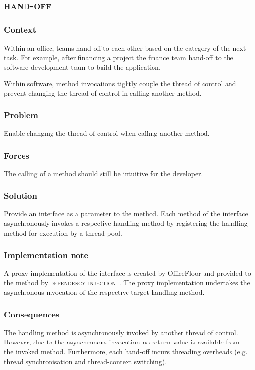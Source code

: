 \documentclass[prodmode]{style/acmlarge}
\begin{document}
\subsection{\textsc{\textbf{hand-off}}}

\subsubsection*{Context} Within an office, teams hand-off to each other based on
the category of the next task.  For example, after financing a project the
finance team hand-off to the software development team to build the application.

Within software, method invocations tightly couple the thread of control and
prevent changing the thread of control in calling another method.

\subsubsection*{\textbf{Problem}} Enable changing the thread of control when calling
another method.

\subsubsection*{Forces} The calling of a method should still be intuitive for
the developer.

\subsubsection*{\textbf{Solution}}  Provide an interface as a parameter to the
method.  Each method of the interface asynchronously invokes a respective
handling method by registering the handling method for execution by a thread
pool.

\subsubsection*{Implementation note} A proxy implementation of the interface is
created by OfficeFloor and provided to the method by \textsc{dependency
injection}~\cite{ioc}.  The proxy implementation undertakes the asynchronous
invocation of the respective target handling method.

\subsubsection*{Consequences} The handling method is asynchronously invoked by
another thread of control.  However, due to the asynchronous invocation no
return value is available from the invoked method.  Furthermore, each hand-off
incurs threading overheads (e.g. thread synchronisation and thread-context
switching).
\end{document}

